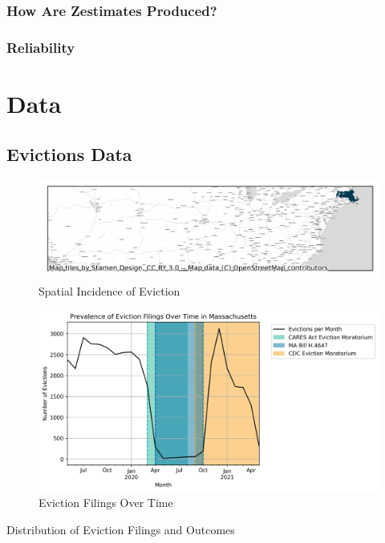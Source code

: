 \documentclass[12pt]{article}
\begin{document}
        \subsubsection{How Are Zestimates Produced?}
        \subsubsection{Reliability}
\section{Data} \label{sec:data}
    \begin{landscape}
    \subsection{Evictions Data}
        \begin{figure}[H]
            \centering
            \includegraphics{output/summary_statistics/figures/evictions_map.png}
            \caption{Spatial Incidence of Eviction}
            \label{fig:my_label}
        \end{figure}

        \begin{figure}[H]
            \centering
            \includegraphics{output/summary_statistics/figures/filings_over_time.png}
            \caption{Eviction Filings Over Time}
            \label{fig:my_label}
        \end{figure}
    \end{landscape}
        \begin{table}[H]
            \centering
            
            \caption{Distribution of Eviction Filings and Outcomes}
            \label{tab:my_label}
        \end{table}
    
\end{document}
